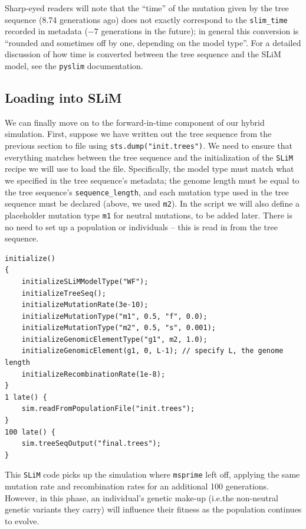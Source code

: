 \documentclass[12pt]{article}
\newcommand{\msprime}[0]{\texttt{msprime}\xspace}
\newcommand{\slim}[0]{\texttt{SLiM}\xspace}
\newcommand{\pyslim}[0]{\texttt{pyslim}\xspace}
\newcommand*{\ie}{i.e.\xcomma}
\begin{document}
Sharp-eyed readers will note that the ``time'' of the mutation given by the tree sequence (8.74 generations ago) does not exactly
correspond to the \verb|slim_time| recorded in metadata ($-7$ generations in the future); in general this conversion is ``rounded and sometimes
off by one, depending on the model type''. For a detailed discussion of how time is converted between the tree sequence and the SLiM
model, see the \pyslim documentation.

\subsection*{Loading into SLiM}

We can finally move on to the forward-in-time component of our hybrid simulation.
First, suppose we have written out the tree sequence from the previous section to file
using \verb|sts.dump("init.trees")|.
We need to ensure that everything matches
between the tree sequence and the initialization of the \slim recipe we will use to load the file.
Specifically, the model type must match what we specified in the tree sequence's metadata;
the genome length must be equal to the tree sequence's \verb|sequence_length|,
and each mutation type used in the tree sequence must be declared (above, we used \verb|m2|).
In the script we will also define a placeholder mutation type \verb|m1| for neutral mutations, to be added later.
There is no need to set up a population or individuals -- this is read in from the tree sequence.
\begin{verbatim}
initialize()
{
    initializeSLiMModelType("WF");
    initializeTreeSeq();
    initializeMutationRate(3e-10);
    initializeMutationType("m1", 0.5, "f", 0.0);
    initializeMutationType("m2", 0.5, "s", 0.001);
    initializeGenomicElementType("g1", m2, 1.0);
    initializeGenomicElement(g1, 0, L-1); // specify L, the genome length
    initializeRecombinationRate(1e-8);
}
1 late() { 
    sim.readFromPopulationFile("init.trees");
}
100 late() {
    sim.treeSeqOutput("final.trees");
}
\end{verbatim}
This \slim code picks up the simulation where \msprime left off, applying the same mutation rate and recombination rates
for an additional 100 generations.
However, in this phase, an individual's genetic make-up (\ie the non-neutral genetic variants they carry)
will influence their fitness as the population continues to evolve.
\end{document}

